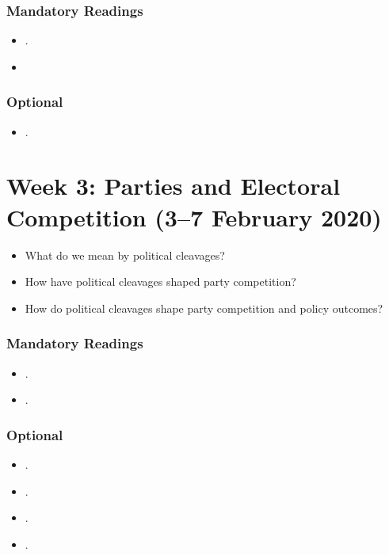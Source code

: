 \documentclass[abstract=on,parskip=full,headings=standardclasses,fontsize=11pt,paper=a4]{scrartcl}
\begin{document}
\subsubsection*{Mandatory Readings}
\begin{itemize}
\item {}.
\item {}
\end{itemize}



\subsubsection*{Optional}
\begin{itemize}
\item {}.
\end{itemize}



\section{Week 3: Parties and Electoral Competition (3--7 February 2020)}

\begin{itemize}
\renewcommand\labelitemi{--}
\item  What do we mean by political cleavages?
\item How have political cleavages shaped party competition? 
\item How do political cleavages shape party competition and policy outcomes?
\end{itemize}


\subsubsection*{Mandatory Readings}

\begin{itemize}
\item {}.
\item {}.
\end{itemize}



\subsubsection*{Optional}
\begin{itemize}
\item {}.
\item {}.
\item {}.
\item {}.
\end{itemize}
\end{document}
